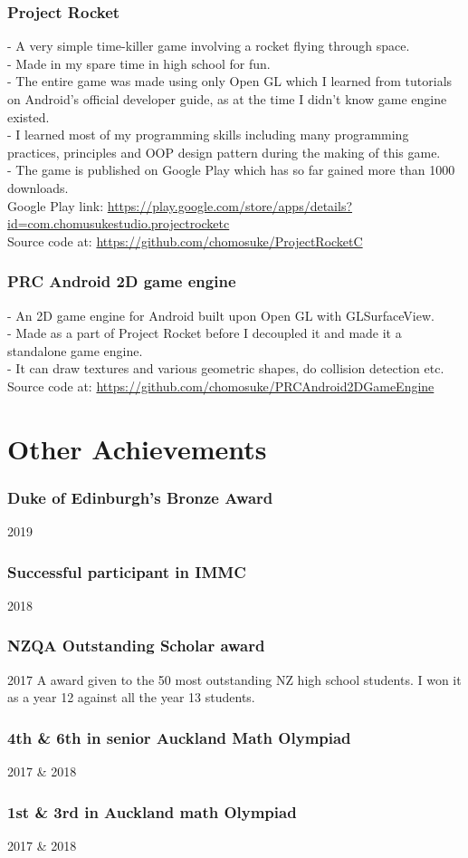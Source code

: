 \documentclass[9pt]{extarticle}
\begin{document}
\subsubsection*{Project Rocket}
- A very simple time-killer game involving a rocket flying through space.\\
- Made in my spare time in high school for fun.\\
- The entire game was made using only Open GL which I learned from tutorials on Android’s official developer guide, as at the time I didn’t know game engine existed.\\
- I learned most of my programming skills including many programming practices, principles and OOP design pattern during the making of this game.\\
- The game is published on Google Play which has so far gained more than 1000 downloads.\\
Google Play link: \url{https://play.google.com/store/apps/details?id=com.chomusukestudio.projectrocketc}\\
Source code at: \url{https://github.com/chomosuke/ProjectRocketC}

\subsubsection*{PRC Android 2D game engine}
- An 2D game engine for Android built upon Open GL with GLSurfaceView.\\
- Made as a part of Project Rocket before I decoupled it and made it a standalone game engine.\\
- It can draw textures and various geometric shapes, do collision detection etc.\\
Source code at: \url{https://github.com/chomosuke/PRCAndroid2DGameEngine}

\section*{Other Achievements}
\subsubsection*{Duke of Edinburgh's Bronze Award}
2019

\subsubsection*{Successful participant in IMMC}
2018

\subsubsection*{NZQA Outstanding Scholar award}
2017
A award given to the 50 most outstanding NZ high school students. I won it as a year 12 against all the year 13 students.

\subsubsection*{4th \& 6th in senior Auckland Math Olympiad}
2017 \& 2018

\subsubsection*{1st \& 3rd in Auckland math Olympiad}
2017 \& 2018
\end{document}
